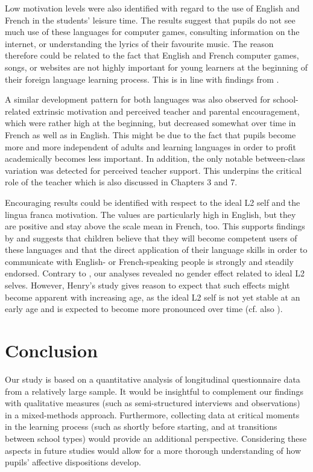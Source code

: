 \documentclass[output=paper]{langsci/langscibook}
\begin{document}
Low motivation levels were also identified with regard to the use of English and French in the students’ leisure time. The results suggest that pupils do not see much use of these languages for computer games, consulting information on the internet, or understanding the lyrics of their favourite music. The reason therefore could be related to the fact that English and French computer games, songs, or websites are not highly important for young learners at the beginning of their foreign language learning process. This is in line with findings from \citet{Heinzmann2013}.

\begin{sloppypar}
A similar development pattern for both languages was also observed for school-related extrinsic motivation and perceived teacher and parental encouragement, which were rather high at the beginning, but decreased somewhat over time in French as well as in English. This might be due to the fact that pupils become more and more independent of adults and learning languages in order to profit academically becomes less important. In addition, the only notable between-class variation was detected for perceived teacher support. This underpins the critical role of the teacher which is also discussed in Chapters 3 and 7. 
\end{sloppypar}

Encouraging results could be identified with respect to the ideal L2 self and the lingua franca motivation. The values are particularly high in English, but they are positive and stay above the scale mean in French, too. This supports findings by \citet{Heinzmann2013} and suggests that children believe that they will become competent users of these languages and that the direct application of their language skills in order to communicate with English- or French-speaking people is strongly and steadily endorsed. Contrary to \citet{Henry2009}, our analyses revealed no gender effect related to ideal L2 selves. However, Henry’s study gives reason to expect that such effects might become apparent with increasing age, as the ideal L2 self is not yet stable at an early age and is expected to become more pronounced over time (cf. also \citealt{Doernyei2009}).

\section{Conclusion}

Our study is based on a quantitative analysis of longitudinal questionnaire data from a relatively large sample. It would be insightful to complement our findings with qualitative measures (such as semi-structured interviews and observations) in a mixed-methods approach. Furthermore, collecting data at critical moments in the learning process (such as shortly before starting, and at transitions between school types) would provide an additional perspective. Considering these aspects in future studies would allow for a more thorough understanding of how pupils' affective dispositions develop.
\end{document}
